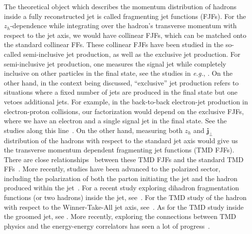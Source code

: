 \documentclass[a4paper, 11 pt]{article}
\begin{document}
The theoretical object which describes the momentum distribution of hadrons inside a fully reconstructed jet is called fragmenting jet functions (FJFs).
For the $z_h$-dependence while integrating over the hadron's transverse momentum with respect to the jet axis, we would have collinear FJFs, which can be matched onto the standard collinear FFs.
These collinear FJFs have been studied in the so-called semi-inclusive jet production, as well as the exclusive jet production.
For semi-inclusive jet production, one measures the signal jet while completely inclusive on other particles in the final state, see the studies in \textit{e.g.}, \cite{Arleo:2013tya, Kaufmann:2015hma, Kang:2016ehg, Dai:2016hzf, Kang:2019ahe, Zhang:2022bhq, Liu:2023fsq}. On the other hand, in the context being discussed, ``exclusive'' jet production refers to situations where a fixed number of jets are produced in the final state but one vetoes additional jets. For example, in the back-to-back electron-jet production in electron-proton collisions, our factorization would depend on the exclusive FJFs, where we have an electron and a single signal jet in the final state. See the studies along this line~\cite{Procura:2009vm, Jain:2011xz, Jain:2011iu, Chien:2015ctp, Kang:2020xyq}. On the other hand, measuring both $z_h$ and $\boldsymbol{j}_{\bot}$ distribution of the hadrons with respect to the standard jet axis would give us the transverse momentum dependent fragmenting jet functions (TMD FJFs). There are close relationships~\cite{Bain:2016rrv, Kang:2017glf, Makris:2017arq, Neill:2018wtk, Kang:2019ahe} between these TMD FJFs and the standard TMD FFs~\cite{Bacchetta:2000jk, Mulders:2000sh, Metz:2016swz}. More recently, studies have been advanced to the polarized sector, including the polarization of both the parton initiating the jet and the hadron produced within the jet~\cite{Kang:2020xyq,Kang:2021ffh,Kang:2021kpt,Zhao:2023lav}. For a recent study exploring dihadron fragmentation functions (or two hadrons) inside the jet, see~\cite{Bacchetta:2023njc,Chien:2021yol}. For the TMD study of the hadron with respect to the Winner-Take-All jet axis, see~\cite{Neill:2016vbi, Neill:2018wtk, Gutierrez-Reyes:2019vbx, Makris:2021drz}. As for the TMD study inside the groomed jet, see \cite{Makris:2017arq, Makris:2018npl, Gutierrez-Reyes:2019msa}. More recently, exploring the connections between TMD physics and the energy-energy correlators has seen a lot of progress~\cite{Gao:2019ojf,Li:2020bub,Kang:2023big}.
\end{document}
